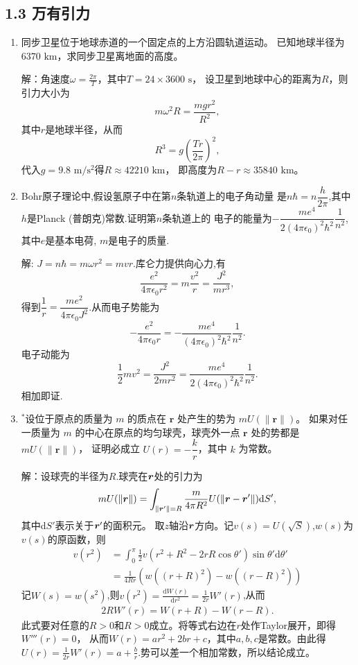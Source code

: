 \subsection{1.3 万有引力}
\begin{enumerate}
    \item 同步卫星位于地球赤道的一个固定点的上方沿圆轨道运动。
    已知地球半径为$6370\text{ km}$，求同步卫星离地面的高度。

    解：角速度$\displaystyle \omega=\frac{2\pi}{T}$，其中$T=24\times3600\text{ s}$，
    设卫星到地球中心的距离为$R$，则引力大小为
    \[m\omega^2R=\frac{mgr^2}{R^2},\]
    其中$r$是地球半径，从而\[R^3=g(\frac{Tr}{2\pi})^2,\]
    代入$g=9.8\text{ m}/\text{s}^2$得$R\approx42210\text{ km}$，
    即高度为$R-r\approx35840\text{ km}$。

    \item Bohr原子理论中,假设氢原子中在第$n$条轨道上的电子角动量
    是$n\hbar=n\dfrac{h}{2\pi}$,其中$h$是Planck (普朗克)常数.证明第$n$条轨道上的
    电子的能量为$-\dfrac{me^4}{2(4\pi\epsilon_0)^2\hbar^2}\dfrac{1}{n^2}$,
    其中$e$是基本电荷, $m$是电子的质量.

    解: $J=n\hbar=m\omega r^2=mvr$.库仑力提供向心力,有
    \[\frac{e^2}{4\pi\epsilon_0r^2}=m\frac{v^2}{r}=\frac{J^2}{mr^3},\]
    得到$\dfrac{1}{r}=\dfrac{me^2}{4\pi\epsilon_0J^2}$.从而电子势能为
    \[-\frac{e^2}{4\pi\epsilon_0r}=-\frac{me^4}{(4\pi\epsilon_0)^2\hbar^2}\frac{1}{n^2}.\]
    电子动能为
    \[\frac{1}{2}mv^2=\frac{J^2}{2mr^2}=\frac{me^4}{2(4\pi\epsilon_0)^2\hbar^2}\frac{1}{n^2}.\]
    相加即证.

    \item ${ }^*$设位于原点的质量为 $m$ 的质点在 $\boldsymbol{r}$ 处产生的势为 $m U(\|\boldsymbol{r}\|)$。
    如果对任一质量为 $m$ 的中心在原点的均匀球壳，球壳外一点 $\boldsymbol{r}$ 处的势都是 $m U(\|\boldsymbol{r}\|)$，
    证明必成立 $U(r)=-\dfrac{k}{r}$，其中 $k$ 为常数。

    解：设球壳的半径为$R$.球壳在$\boldsymbol{r}$处的引力为
    \begin{align*}
        mU(\| \boldsymbol{r} \|)=\int_{\| \boldsymbol{r}'\| = R}\frac{m}{4\pi R^2}U(\| \boldsymbol{r}-\boldsymbol{r}'\|)\text{d}S',
    \end{align*}
    其中d$S'$表示关于$\boldsymbol{r}'$的面积元。
    取$z$轴沿$\boldsymbol{r}$方向。记$v(s)=U(\sqrt{S})$,$w(s)$为$v(s)$的原函数，则
    \begin{align*}
        v(r^2)&=\int_{0}^{\pi}\frac{1}{2}v(r^2+R^2-2rR\cos\theta')\sin\theta'
        \text{d}\theta'\\
        &=\frac{1}{4Rr}(w((r+R)^2)-w((r-R)^2))
    \end{align*}
    记$W(s)=w(s^2)$,则$\displaystyle v(r^2)=\frac{\text{d}W(r)}{\text{d}r^2}=\frac{1}{2r}W'(r)$,从而
    \begin{align*}
    2RW'(r)=W(r+R)-W(r-R).
    \end{align*}
    此式要对任意的$R>0$和$R>0$成立。将等式右边在$r$处作Taylor展开，即得$W'''(r)=0$，
    从而$W(r)=ar^2+2br+c$，其中$a,b,c$是常数。由此得$\displaystyle U(r)=\frac{1}{2r}
    W'(r)=a+\frac{b}{r}$.势可以差一个相加常数，所以结论成立。


\end{enumerate}
